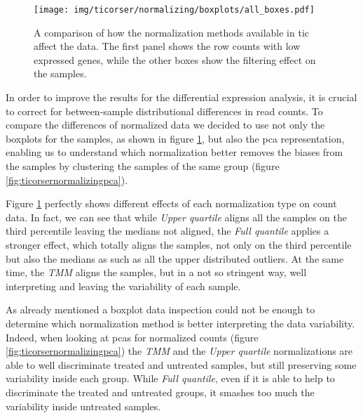\begin{figure}[H]
\centering
\texttt{[image: img/ticorser/normalizing/boxplots/all\_boxes.pdf]}
\caption[ticorser normalizing boxplots]{A comparison of how the normalization methods available in \gls{tic} affect the data.
The first panel shows the row counts with low expressed genes, while the other boxes show the filtering effect on the samples.}
\label{fig:ticorsernormalizingbox}
\end{figure}

In order to improve the results for the differential expression analysis, it is crucial to correct for between-sample distributional differences in read counts.
To compare the differences of normalized data we decided to use not only the boxplots for the samples, as shown in  figure \ref{fig:ticorsernormalizingbox}, but also the \gls{pca} representation, enabling us to understand which normalization better removes the biases from the samples by clustering the samples of the same group (figure \ref{fig:ticorsernormalizingpca}).

Figure \ref{fig:ticorsernormalizingbox} perfectly shows different effects of each normalization type on count data.  
In fact, we can see that while \textit{Upper quartile} aligns all the samples on the third percentile leaving the medians not aligned, the \textit{Full quantile} applies a stronger effect, which totally aligns the samples, not only on the third percentile but also the medians as such as all the upper distributed outliers.
At the same time, the \textit{TMM} aligns the samples, but in a not so stringent way, well interpreting and leaving the variability of each sample.

As already mentioned a boxplot data inspection could not be enough to determine which normalization method is better interpreting the data variability. 
Indeed, when looking at \glspl{pca} for normalized counts (figure \ref{fig:ticorsernormalizingpca}) the \textit{TMM} and the \textit{Upper quartile} normalizations are able to well discriminate treated and untreated samples, but still preserving some variability inside each group.
While \textit{Full quantile}, even if it is able to help to discriminate the treated and untreated groups, it smashes too much the variability inside untreated samples.

